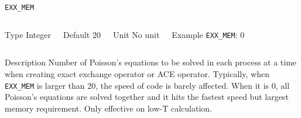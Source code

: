     
    \begin{frame}[allowframebreaks]{\texttt{EXX\_MEM}} \label{EXX_MEM}
    \vspace*{-12pt}
    \begin{columns}
    \begin{block}{Type}
    Integer
    \end{block}
    
    \begin{block}{Default}
    20
    \end{block}
    
    \begin{block}{Unit}
    No unit
    \end{block}
    
    \begin{block}{Example}
    \texttt{EXX\_MEM}: 0
    \end{block}
    \end{columns}
    
    \begin{block}{Description}
    Number of Poisson's equations to be solved in each process at a time when creating exact exchange operator or ACE operator. Typically, when \texttt{EXX\_MEM} is larger than 20, the speed of code is barely affected. When it is 0, all Poisson's equations are solved together and it hits the fastest speed but largest memory requirement. Only effective on low-T calculation.
    \end{block}
    
    \end{frame}
    

